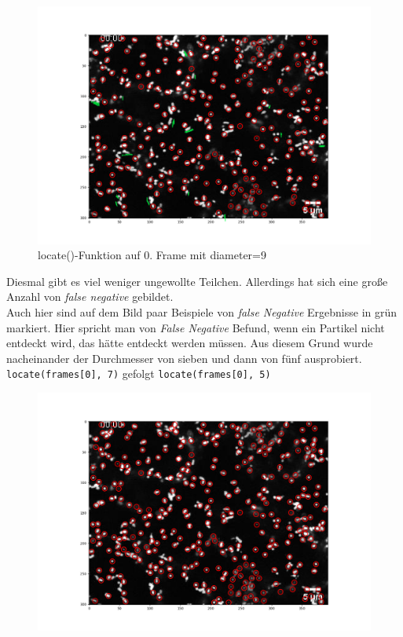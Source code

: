 \begin{enumerate}
\begin{figure}[H]
    \centering
    \includegraphics[scale=0.35]{Grafiken/trackpyBilder/locate(frames[0], 9).png}
    \caption{locate()-Funktion auf 0. Frame mit diameter=9}
    \label{fig:kap3_d=9}
\end{figure} 

Diesmal gibt es viel weniger ungewollte Teilchen. Allerdings hat sich eine große Anzahl von \textit{\gls{false negative}} gebildet. \\ 
Auch hier sind auf dem Bild paar Beispiele von  \textit{false Negative} Ergebnisse in grün markiert.
Hier spricht man von \textit{False Negative} Befund, wenn ein Partikel nicht entdeckt wird, das hätte entdeckt werden müssen.
Aus diesem Grund wurde nacheinander der Durchmesser von sieben und dann von fünf ausprobiert.\\
\texttt{locate(frames[0], 7)}   gefolgt  \texttt{locate(frames[0], 5)}
\newpage

\begin{figure}[H]
    \centering
    \begin{minipage}{.5\textwidth}
     	\centering
  	  	\includegraphics[scale=0.3]{Grafiken/trackpyBilder/locate(frames[0], 7).png}
 		\label{fig:kap3_d=7}
    \end{minipage}
	

\end{figure}
\end{enumerate}
